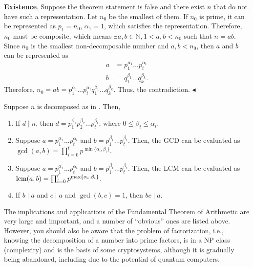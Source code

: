 \documentclass[../lecture-notes.tex]{subfiles}
\begin{document}
\textcolor{green!60!black}{\textbf{Existence}}. Suppose the theorem statement is false and there exist $n$ that do not have such a representation.
Let $n_0$ be the smallest of them.
If $n_0$ is prime, it can be represented as $p_1=n_0$, $\alpha_1=1$, which satisfies the representation. Therefore, $n_0$ must be composite, which means $\exists a, b \in \mathbb{N}, 1 < a, b < n_0$ such that $n = ab$.
Since $n_0$ is the smallest non-decomposable number and $a, b < n_0$, then $a$ and $b$ can be represented as 
\begin{align*}
    a &= p_{1}^{\alpha_{1}} \dots p_{t}^{\alpha_{t}} \\
    b &= q_{1}^{\beta_{1}} \dots q_{k}^{\beta_{k}}.
\end{align*}
Therefore, $n_0 = ab=p_{1}^{\alpha_{1}} \dots p_{t}^{\alpha_{t}} q_{1}^{\beta_{1}} \dots q_{k}^{\beta_{k}}$. Thus, the contradiction. $\blacktriangleleft$  

\begin{corollary}
    Suppose $n$ is decomposed as in . Then,

    \begin{enumerate}
        \item If $d \mid n$, then $d = p_{1}^{\beta_1}p_{2}^{\beta_2} \dots p_{t}^{\beta_t}$, where $0 \leq \beta_i \leq \alpha_i$.
        \item Suppose $a = p_{1}^{\alpha_1} \dots p_{t}^{\alpha_t}$ and $b = p_{1}^{\beta_1} \dots p_{t}^{\beta_t}$. Then, the GCD can be evaluated as $\gcd(a, b) = \prod_{i=0}^{t}p^{\min\{\alpha_i, \beta_i\}}$.
        \item Suppose $a = p_{1}^{\alpha_1} \dots p_{t}^{\alpha_t}$ and $b = p_{1}^{\beta_1} \dots p_{t}^{\beta_t}$. Then, the LCM can be evaluated as $\text{lcm}(a, b) = \prod_{i=0}^{t}p^{\max\{\alpha_i, \beta_i\}}$.
        \item If $b \mid a$ and $c \mid a$ and $\gcd(b, c) = 1$, then $bc \mid a$.
    \end{enumerate}
\end{corollary}

The implications and applications of the Fundamental Theorem of Arithmetic are very large and important, and a number of “obvious” ones are listed above.
However, you should also be aware that the problem of factorization, i.e., knowing the decomposition of a number into prime factors, is in a NP class (complexity) and is the basis of some cryptosystems, although it is gradually being abandoned, including due to the potential of quantum computers.
\end{document}

